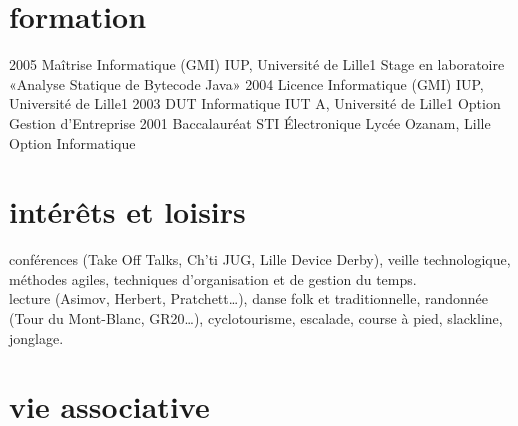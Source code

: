 \documentclass[]{cv} %
\begin{document}
\section{formation}

\begin{entrylist}
\entry
{2005}
{Maîtrise {\normalfont Informatique (GMI)}}
{IUP, Université de Lille1}
{Stage en laboratoire «Analyse Statique de Bytecode Java»}
\entry
{2004}
{Licence {\normalfont Informatique (GMI)}}
{IUP, Université de Lille1}
{}
\entry
{2003}
{DUT {\normalfont Informatique}}
{IUT A, Université de Lille1}
{Option Gestion d'Entreprise}
\entry
{2001}
{Baccalauréat {\normalfont STI Électronique}}
{Lycée Ozanam, Lille}
{Option Informatique}
\end{entrylist}

\par\vspace{5\parskip}
\section{intérêts et loisirs}

\textbf{} conférences (Take Off Talks, Ch'ti JUG, Lille Device Derby), veille technologique, méthodes agiles, techniques d'organisation et de gestion du temps.
\vspace{10pt}\\
\textbf{} lecture (Asimov, Herbert, Pratchett…), danse folk et traditionnelle, randonnée (Tour du Mont-Blanc, GR20…), cyclotourisme, escalade, course à pied, slackline, jonglage.

\par\vspace{50\parskip}
\section{vie associative}
\end{document}

